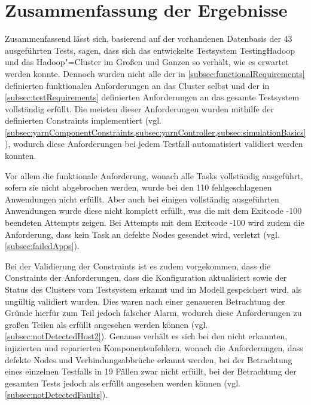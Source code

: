 \section{Zusammenfassung der Ergebnisse}
\label{sec:evaluationResults}

Zusammenfassend lässt sich, basierend auf der vorhandenen Datenbasis der 43 ausgeführten Tests, sagen, dass sich das entwickelte Testsystem TestingHadoop und das Hadoop"=Cluster im Großen und Ganzen so verhält, wie es erwartet werden konnte.
Dennoch wurden nicht alle der in \cref{subsec:functionalRequirements} definierten funktionalen Anforderungen an das Cluster selbst und der in \cref{subsec:testRequirements} definierten Anforderungen an das gesamte Testsystem vollständig erfüllt.
Die meisten dieser Anforderungen wurden mithilfe der definierten Constraints implementiert (vgl. \cref{subsec:yarnComponentConstraints,subsec:yarnController,subsec:simulationBasics}), wodurch diese Anforderungen bei jedem Testfall automatisiert validiert werden konnten.

Vor allem die funktionale Anforderung, wonach alle Tasks vollständig ausgeführt, sofern sie nicht abgebrochen werden, wurde bei den 110 fehlgeschlagenen Anwendungen nicht erfüllt.
Aber auch bei einigen vollständig ausgeführten Anwendungen wurde diese nicht komplett erfüllt, was die mit dem Exitcode -100 beendeten Attempts zeigen.
Bei Attempts mit dem Exitcode -100 wird zudem die Anforderung, dass kein Task an defekte Nodes gesendet wird, verletzt (vgl. \cref{subsec:failedApps}).

Bei der Validierung der Constraints ist es zudem vorgekommen, dass die Constraints der Anforderungen, dass die Konfiguration aktualisiert sowie der Status des Clusters vom Testsystem erkannt und im Modell gespeichert wird, als ungültig validiert wurden.
Dies waren nach einer genaueren Betrachtung der Gründe hierfür zum Teil jedoch falscher Alarm, wodurch diese Anforderungen zu großen Teilen als erfüllt angesehen werden können (vgl. \cref{subsec:notDetectedHost2}).
Genauso verhält es sich bei den nicht erkannten, injizierten und reparierten Komponentenfehlern, wonach die Anforderungen, dass defekte Nodes und Verbindungsabbrüche erkannt werden, bei der Betrachtung eines einzelnen Testfalls in 19 Fällen zwar nicht erfüllt, bei der Betrachtung der gesamten Tests jedoch als erfüllt angesehen werden können (vgl. \cref{subsec:notDetectedFaults}).

